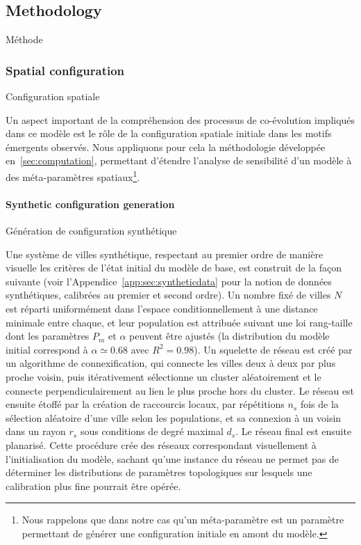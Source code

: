 \subsection{Methodology}{Méthode}

\subsubsection{Spatial configuration}{Configuration spatiale}

Un aspect important de la compréhension des processus de co-évolution impliqués dans ce modèle est le rôle de la configuration spatiale initiale dans les motifs émergents observés. Nous appliquons pour cela la méthodologie développée en~\ref{sec:computation}, permettant d'étendre l'analyse de sensibilité d'un modèle à des méta-paramètres spatiaux\footnote{Nous rappelons que dans notre cas qu'un méta-paramètre est un paramètre permettant de générer une configuration initiale en amont du modèle.}.

\paragraph{Synthetic configuration generation}{Génération de configuration synthétique}

Une système de villes synthétique, respectant au premier ordre de manière visuelle les critères de l'état initial du modèle de base, est construit de la façon suivante (voir l'Appendice~\ref{app:sec:syntheticdata} pour la notion de données synthétiques, calibrées au premier et second ordre). Un nombre fixé de villes $N$ est réparti uniformément dans l'espace conditionnellement à une distance minimale entre chaque, et leur population est attribuée suivant une loi rang-taille dont les paramètres $P_{m}$ et $\alpha$ peuvent être ajustés (la distribution du modèle initial correspond à $\alpha\simeq 0.68$ avec $R^2=0.98$). Un squelette de réseau est créé par un algorithme de connexification, qui connecte les villes deux à deux par plus proche voisin, puis itérativement sélectionne un cluster aléatoirement et le connecte perpendiculairement au lien le plus proche hors du cluster. Le réseau est ensuite étoffé par la création de raccourcis locaux, par répétitions $n_s$ fois de la sélection aléatoire d'une ville selon les populations, et sa connexion à un voisin dans un rayon $r_s$ sous conditions de degré maximal $d_s$. Le réseau final est ensuite planarisé. Cette procédure crée des réseaux correspondant visuellement à l'initialisation du modèle, sachant qu'une instance du réseau ne permet pas de déterminer les distributions de paramètres topologiques sur lesquels une calibration plus fine pourrait être opérée.


